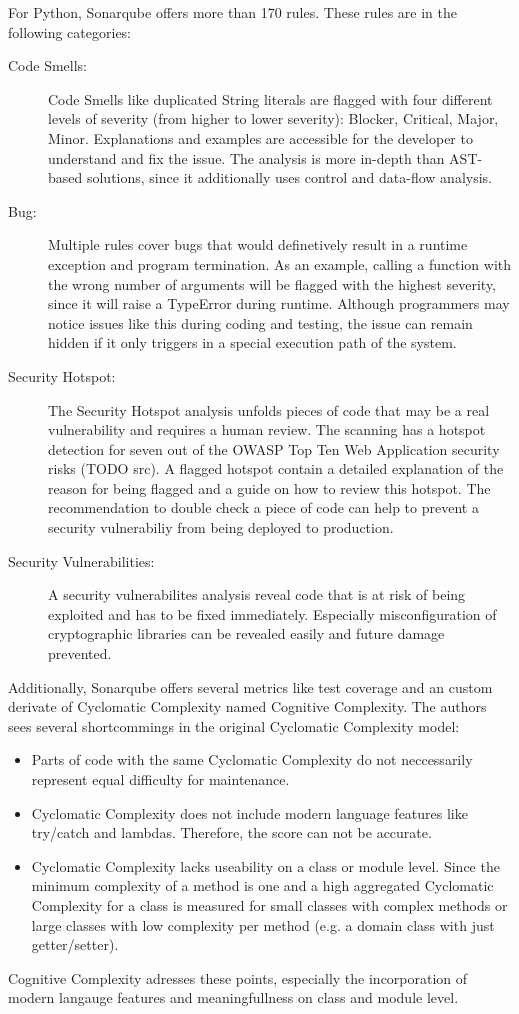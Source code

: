 For Python, Sonarqube offers more than 170 rules. These rules are in the following categories:
\begin{description}
    \item[Code Smells:] Code Smells like duplicated String literals are flagged with four different levels of severity (from higher to lower severity): Blocker, Critical, Major, Minor. Explanations and examples are accessible for the developer to understand and fix the issue. The analysis is more in-depth than AST-based solutions, since it additionally uses control and data-flow analysis.
    \item[Bug:] Multiple rules cover bugs that would definetively result in a runtime exception and program termination. As an example, calling a function with the wrong number of arguments will be flagged with the highest severity, since it will raise a TypeError during runtime. Although programmers may notice issues like this during coding and testing, the issue can remain hidden if it only triggers in a special execution path of the system.
    \item[Security Hotspot: ] The Security Hotspot analysis unfolds pieces of code that may be a real vulnerability and requires a human review. The scanning has a hotspot detection for seven out of the OWASP Top Ten Web Application security risks (TODO src). A flagged hotspot contain a detailed explanation of the reason for being flagged and a guide on how to review this hotspot. The recommendation to double check a piece of code can help to prevent a security vulnerabiliy from being deployed to production.
    \item[Security Vulnerabilities: ]  A security vulnerabilites analysis reveal code that is at risk of being exploited and has to be fixed immediately. Especially misconfiguration of cryptographic libraries can be revealed easily and future damage prevented.   
\end{description}

Additionally, Sonarqube offers several metrics like test coverage and an custom derivate of Cyclomatic Complexity named Cognitive Complexity. The authors sees several shortcommings in the original Cyclomatic Complexity model:
\begin{itemize}
    \item Parts of code with the same Cyclomatic Complexity do not neccessarily represent equal difficulty for maintenance.
    \item  Cyclomatic Complexity does not include modern language features like try/catch and lambdas. Therefore, the score can not be accurate.
    \item Cyclomatic Complexity lacks useability on a class or module level. Since the minimum complexity of a method is one and a high aggregated Cyclomatic Complexity for a class is measured for small classes with complex methods or large classes with low complexity per method (e.g. a domain class with just getter/setter).
\end{itemize}
Cognitive Complexity adresses these points, especially the incorporation of modern langauge features and meaningfullness on class and module level.

